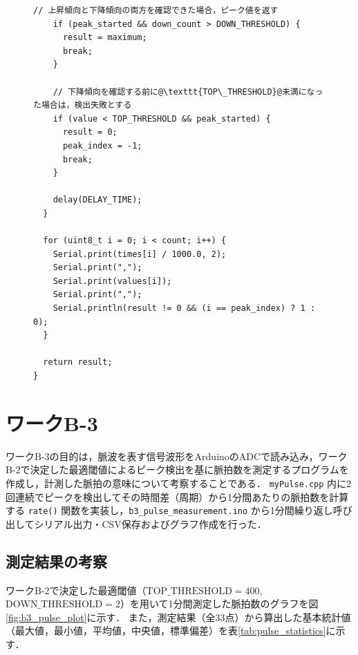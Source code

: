 \begin{figure}[H]
  \begin{lstlisting}[caption=myPulse.cpp（後半：ピーク確定および一括シリアル出力処理）, label=b2_myPulse.cpp_part2, firstnumber=55, escapechar=\@]
    // 上昇傾向と下降傾向の両方を確認できた場合，ピーク値を返す
    if (peak_started && down_count > DOWN_THRESHOLD) {
      result = maximum;
      break;
    }

    // 下降傾向を確認する前に@\texttt{TOP\_THRESHOLD}@未満になった場合は，検出失敗とする
    if (value < TOP_THRESHOLD && peak_started) {
      result = 0;
      peak_index = -1;
      break;
    }

    delay(DELAY_TIME);
  }

  for (uint8_t i = 0; i < count; i++) {
    Serial.print(times[i] / 1000.0, 2);
    Serial.print(",");
    Serial.print(values[i]);
    Serial.print(",");
    Serial.println(result != 0 && (i == peak_index) ? 1 : 0);
  }

  return result;
}
    \end{lstlisting}
\end{figure}


\section{ワークB-3}
ワークB-3の目的は，脈波を表す信号波形をArduinoのADCで読み込み，ワークB-2で決定した最適閾値によるピーク検出を基に脈拍数を測定するプログラムを作成し，計測した脈拍の意味について考察することである．
\texttt{myPulse.cpp} 内に2回連続でピークを検出してその時間差（周期）から1分間あたりの脈拍数を計算する \texttt{rate()} 関数を実装し，\texttt{b3\_pulse\_measurement.ino} から1分間繰り返し呼び出してシリアル出力・CSV保存およびグラフ作成を行った．

\subsection{測定結果の考察}

ワークB-2で決定した最適閾値（$\mathrm{TOP\_THRESHOLD} = 400$, $\mathrm{DOWN\_THRESHOLD} = 2$）を用いて1分間測定した脈拍数のグラフを図\ref{fig:b3_pulse_plot}に示す．
また，測定結果（全33点）から算出した基本統計値（最大値，最小値，平均値，中央値，標準偏差）を表\ref{tab:pulse_statistics}に示す．

